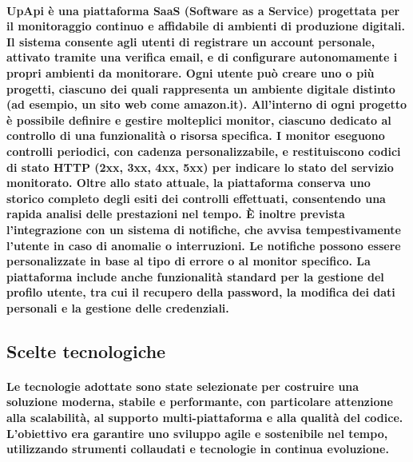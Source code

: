 \paragraph{UpApi è una piattaforma SaaS (Software as a Service) progettata per il monitoraggio continuo 
e affidabile di ambienti di produzione digitali. 
Il sistema consente agli utenti di registrare un account personale, attivato tramite una verifica email, 
e di configurare autonomamente i propri ambienti da monitorare.
Ogni utente può creare uno o più progetti, 
ciascuno dei quali rappresenta un ambiente digitale distinto (ad esempio, un sito web come amazon.it). 
All'interno di ogni progetto è possibile definire e gestire molteplici monitor, 
ciascuno dedicato al controllo di una funzionalità o risorsa specifica.
I monitor eseguono controlli periodici, con cadenza personalizzabile, 
e restituiscono codici di stato HTTP (2xx, 3xx, 4xx, 5xx) per indicare lo stato del servizio monitorato. 
Oltre allo stato attuale, la piattaforma conserva uno storico completo degli esiti dei controlli effettuati, 
consentendo una rapida analisi delle prestazioni nel tempo.
È inoltre prevista l’integrazione con un sistema di notifiche, 
che avvisa tempestivamente l’utente in caso di anomalie o interruzioni. 
Le notifiche possono essere personalizzate in base al tipo di errore o al monitor specifico.
La piattaforma include anche funzionalità standard per la gestione del profilo utente, 
tra cui il recupero della password, la modifica dei dati personali e la gestione delle credenziali.
}

\subsection{Scelte tecnologiche}

\paragraph{ Le tecnologie adottate sono state selezionate per costruire una soluzione moderna, stabile e performante, con particolare attenzione alla scalabilità, al supporto multi-piattaforma e alla qualità del codice. L’obiettivo era garantire uno sviluppo agile e sostenibile nel tempo, utilizzando strumenti collaudati e tecnologie in continua evoluzione. }